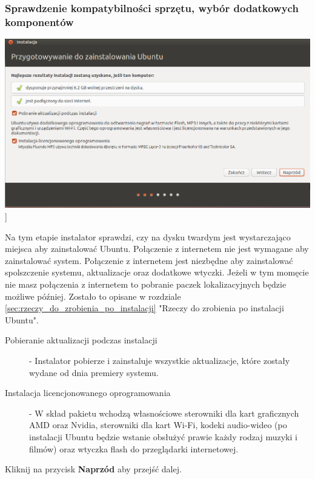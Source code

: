 \subsubsection{Sprawdzenie kompatybilności sprzętu, wybór dodatkowych komponentów}
\begin{center}
        \includegraphics[scale=0.5]{images/instalator_wymagania.png}]
\end{center}
Na tym etapie instalator sprawdzi, czy na dysku twardym jest wystarczająco miejsca aby zainstalować Ubuntu. Połączenie z internetem nie jest wymagane aby zainstalować system. Połączenie z internetem jest niezbędne aby zainstalować spolszczenie systemu, aktualizacje oraz dodatkowe wtyczki. Jeżeli w tym momęcie nie masz połączenia z internetem to pobranie paczek lokalizacyjnych będzie możliwe później. Zostało to opisane w rozdziale \ref{sec:rzeczy_do_zrobienia_po_instalacji} "Rzeczy do zrobienia po instalacji Ubuntu".
\begin{description}
\item[Pobieranie aktualizacji podczas instalacji] - Instalator pobierze i zainstaluje wszystkie aktualizacje, które zostały wydane od dnia premiery systemu.
\item[Instalacja licencjonowanego oprogramowania] - W skład pakietu wchodzą własnościowe sterowniki dla kart graficznych AMD oraz Nvidia, sterowniki dla kart Wi-Fi, kodeki audio-wideo (po instalacji Ubuntu będzie wstanie obsłużyć prawie każdy rodzaj muzyki i filmów) oraz wtyczka flash do przeglądarki internetowej.
\end{description}
\begin{flushright}
Kliknij na przycisk \textbf{Naprzód} aby przejść dalej.
\end{flushright}
\clearpage
